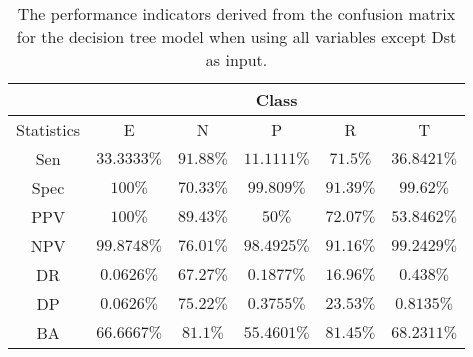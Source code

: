 \begin{table}[!ht]
	\centering
	\begin{tabular}{|c|c|c|c|c|c|}
		\hline
		 & \multicolumn{5}{c|}{Class} \\ \hline
		Statistics & E & N & P & R & T \\ \hline
		Sen & $33.3333\%$ & $91.88\%$ & $11.1111\%$ & $71.5\%$ & $36.8421\%$ \\ \hline
		Spec & $100\%$ & $70.33\%$ & $99.809\%$ & $91.39\%$ & $99.62\%$ \\ \hline
		PPV & $100\%$ & $89.43\%$ & $50\%$ & $72.07\%$ & $53.8462\%$ \\ \hline
		NPV & $99.8748\%$ & $76.01\%$ & $98.4925\%$ & $91.16\%$ & $99.2429\%$ \\ \hline
		DR & $0.0626\%$ & $67.27\%$ & $0.1877\%$ & $16.96\%$ & $0.438\%$ \\ \hline
		DP & $0.0626\%$ & $75.22\%$ & $0.3755\%$ & $23.53\%$ & $0.8135\%$ \\ \hline
		BA & $66.6667\%$ & $81.1\%$ & $55.4601\%$ & $81.45\%$ & $68.2311\%$ \\ \hline
	\end{tabular}
	\caption{The performance indicators derived from the confusion matrix for the decision tree model when using all variables except Dst as input.}
	\label{tab:cs:reverse:noDst:C5.0}
\end{table}
